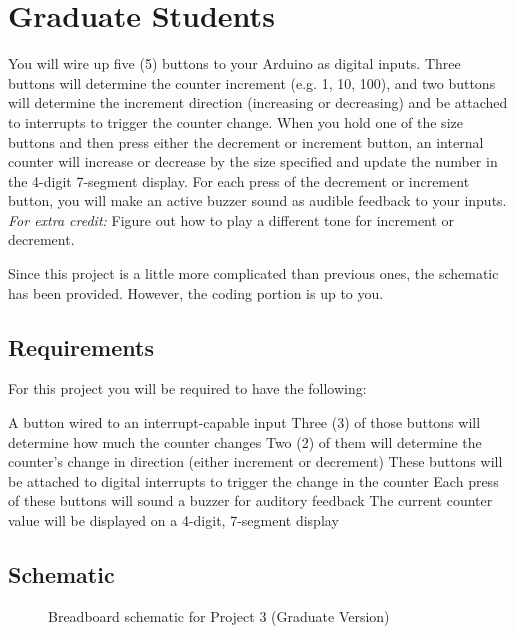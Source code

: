 \section*{Graduate Students} 
You will wire up five (5) buttons to your Arduino as digital inputs.
Three buttons will determine the counter increment (e.g. 1, 10, 100), and two buttons will determine the increment direction (increasing or decreasing) and be attached to interrupts to trigger the counter change.
When you hold one of the size buttons and then press either the decrement or increment button, an internal counter will increase or decrease by the size specified and update the number in the 4-digit 7-segment display.
For each press of the decrement or increment button, you will make an active buzzer sound as audible feedback to your inputs. \emph{For extra credit:} Figure out how to play a different tone for increment or decrement.

Since this project is a little more complicated than previous ones, the schematic has been provided. However, the coding portion is up to you.

    \subsection*{Requirements}
    For this project you will be required to have the following:
    \begin{outline}
        \1 A button wired to an interrupt-capable input
            \2 Three (3) of those buttons will determine how much the counter changes
            \2 Two (2) of them will determine the counter's change in direction (either increment or decrement)
                \3 These buttons will be attached to digital interrupts to trigger the change in the counter
                \3 Each press of these buttons will sound a buzzer for auditory feedback
        \1 The current counter value will be displayed on a 4-digit, 7-segment display
    \end{outline}

    \subsection*{Schematic}
    \begin{figure*}[ht!]
        \caption{Breadboard schematic for Project 3 (Graduate Version)}
    \end{figure*}

